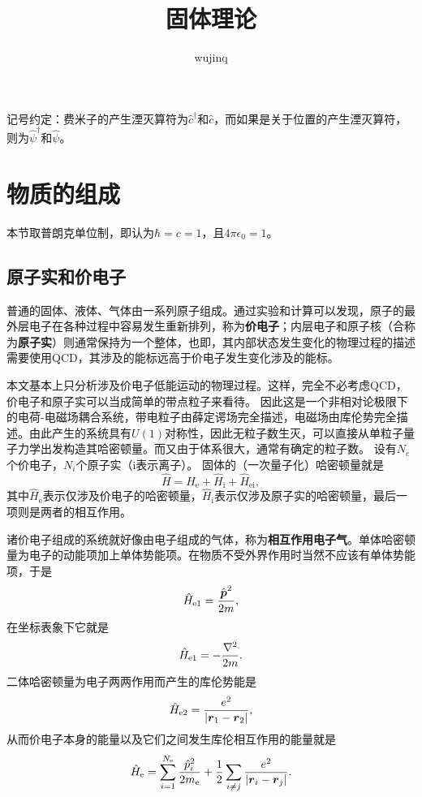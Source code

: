 \documentclass[hyperref, UTF8, a4paper]{ctexart}
\title{固体理论}
\author{wujinq}
\begin{document}
\maketitle

记号约定：费米子的产生湮灭算符为$\hat{c}^\dagger$和$\hat{c}$，而如果是关于位置的产生湮灭算符，则为$\hat{\psi}^\dagger$和$\hat{\psi}$。

\section{物质的组成}

本节取普朗克单位制，即认为$\hbar=c=1$，且$4\pi\epsilon_0=1$。

\subsection{原子实和价电子}

普通的固体、液体、气体由一系列原子组成。通过实验和计算可以发现，原子的最外层电子在各种过程中容易发生重新排列，称为\textbf{价电子}；内层电子和原子核（合称为\textbf{原子实}）则通常保持为一个整体，也即，其内部状态发生变化的物理过程的描述需要使用QCD，其涉及的能标远高于价电子发生变化涉及的能标。

本文基本上只分析涉及价电子低能运动的物理过程。这样，完全不必考虑QCD，价电子和原子实可以当成简单的带点粒子来看待。
因此这是一个非相对论极限下的电荷-电磁场耦合系统，带电粒子由薛定谔场完全描述，电磁场由库伦势完全描述。由此产生的系统具有$U(1)$对称性，因此无粒子数生灭，可以直接从单粒子量子力学出发构造其哈密顿量。而又由于体系很大，通常有确定的粒子数。
设有$N_e$个价电子，$N_i$个原子实（i表示离子）。
固体的（一次量子化）哈密顿量就是
\begin{equation}
    \hat{H} = \hat{H}_\text{e} + \hat{H}_\text{i} + \hat{H}_\text{ei},
    \label{eq:many-body-hamiltonian}
\end{equation}
其中$\hat{H}_\text{e}$表示仅涉及价电子的哈密顿量，$\hat{H}_\text{i}$表示仅涉及原子实的哈密顿量，最后一项则是两者的相互作用。

诸价电子组成的系统就好像由电子组成的气体，称为\textbf{相互作用电子气}。单体哈密顿量为电子的动能项加上单体势能项。在物质不受外界作用时当然不应该有单体势能项，于是
\[
    \hat{H}_\text{e1} = \frac{\hat{\vb*{p}}^2}{2m},
\]
在坐标表象下它就是
\[
    \hat{H}_\text{e1} = - \frac{\laplacian}{2m}.
\]
二体哈密顿量为电子两两作用而产生的库伦势能是
\[
    \hat{H}_\text{e2} = \frac{e^2}{\abs{\vb*{r}_1 - \vb*{r}_2}},
\]
从而价电子本身的能量以及它们之间发生库伦相互作用的能量就是
\begin{equation}
    \hat{H}_\text{e} = \sum_{i=1}^{N_\text{e}} \frac{\hat{p}_i^2}{2m_\text{e}} + \frac{1}{2} \sum_{i\neq j} \frac{e^2}{\abs{\vb*{r}_i - \vb*{r}_j}}.
\end{equation}
\end{document}

